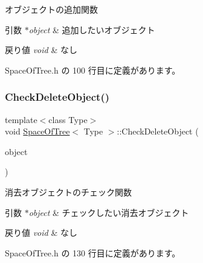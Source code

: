 オブジェクトの追加関数 


\begin{DoxyParams}{引数}
{\em $\ast$object} & 追加したいオブジェクト \\
\hline
\end{DoxyParams}

\begin{DoxyRetVals}{戻り値}
{\em void} & なし \\
\hline
\end{DoxyRetVals}


 Space\+Of\+Tree.\+h の 100 行目に定義があります。

\mbox{\label{class_space_of_tree_a746aef6b3bafdde17daa5125cc9bc43c}} 
\subsubsection{\texorpdfstring{Check\+Delete\+Object()}{CheckDeleteObject()}}
{\footnotesize\ttfamily template$<$class Type$>$ \\
void \mbox{\hyperlink{class_space_of_tree}{Space\+Of\+Tree}}$<$ Type $>$\+::Check\+Delete\+Object (\begin{DoxyParamCaption}\item[{\mbox{\hyperlink{class_object_of_tree}{Object\+Of\+Tree}}$<$ Type $>$ $\ast$}]{object }\end{DoxyParamCaption})\hspace{0.3cm}{\ttfamily [inline]}}



消去オブジェクトのチェック関数 


\begin{DoxyParams}{引数}
{\em $\ast$object} & チェックしたい消去オブジェクト \\
\hline
\end{DoxyParams}

\begin{DoxyRetVals}{戻り値}
{\em void} & なし \\
\hline
\end{DoxyRetVals}


 Space\+Of\+Tree.\+h の 130 行目に定義があります。

\mbox{\label{class_space_of_tree_a97ee8bf10b8d88d49e61875c88608b15}} 
